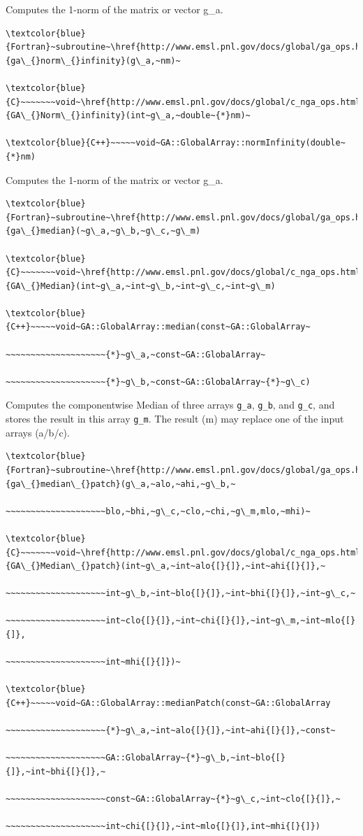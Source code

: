 Computes the 1-norm of the matrix or vector g\_a. 
\begin{verbatim}
\textcolor{blue}{Fortran}~subroutine~\href{http://www.emsl.pnl.gov/docs/global/ga_ops.html\#ga_norm_infinity}{ga\_{}norm\_{}infinity}(g\_a,~nm)~

\textcolor{blue}{C}~~~~~~~void~\href{http://www.emsl.pnl.gov/docs/global/c_nga_ops.html\#ga_norm_infinity}{GA\_{}Norm\_{}infinity}(int~g\_a,~double~{*}nm)~

\textcolor{blue}{C++}~~~~~void~GA::GlobalArray::normInfinity(double~{*}nm)
\end{verbatim}
Computes the 1-norm of the matrix or vector g\_a. 
\begin{verbatim}
\textcolor{blue}{Fortran}~subroutine~\href{http://www.emsl.pnl.gov/docs/global/ga_ops.html\#ga_median}{ga\_{}median}(~g\_a,~g\_b,~g\_c,~g\_m)

\textcolor{blue}{C}~~~~~~~void~\href{http://www.emsl.pnl.gov/docs/global/c_nga_ops.html\#ga_median}{GA\_{}Median}(int~g\_a,~int~g\_b,~int~g\_c,~int~g\_m)

\textcolor{blue}{C++}~~~~~void~GA::GlobalArray::median(const~GA::GlobalArray~

~~~~~~~~~~~~~~~~~~~~{*}~g\_a,~const~GA::GlobalArray~

~~~~~~~~~~~~~~~~~~~~{*}~g\_b,~const~GA::GlobalArray~{*}~g\_c)
\end{verbatim}
Computes the componentwise Median of three arrays \texttt{g\_a}, \texttt{g\_b},
and \texttt{g\_c}, and stores the result in this array \texttt{g\_m}.
The result (m) may replace one of the input arrays (a/b/c). 
\begin{verbatim}
\textcolor{blue}{Fortran}~subroutine~\href{http://www.emsl.pnl.gov/docs/global/ga_ops.html\#ga_median_patch}{ga\_{}median\_{}patch}(g\_a,~alo,~ahi,~g\_b,~

~~~~~~~~~~~~~~~~~~~~blo,~bhi,~g\_c,~clo,~chi,~g\_m,mlo,~mhi)~

\textcolor{blue}{C}~~~~~~~void~\href{http://www.emsl.pnl.gov/docs/global/c_nga_ops.html\#ga_median_patch}{GA\_{}Median\_{}patch}(int~g\_a,~int~alo{[}{]},~int~ahi{[}{]},~

~~~~~~~~~~~~~~~~~~~~int~g\_b,~int~blo{[}{]},~int~bhi{[}{]},~int~g\_c,~

~~~~~~~~~~~~~~~~~~~~int~clo{[}{]},~int~chi{[}{]},~int~g\_m,~int~mlo{[}{]},

~~~~~~~~~~~~~~~~~~~~int~mhi{[}{]})~

\textcolor{blue}{C++}~~~~~void~GA::GlobalArray::medianPatch(const~GA::GlobalArray

~~~~~~~~~~~~~~~~~~~~{*}~g\_a,~int~alo{[}{]},~int~ahi{[}{]},~const~

~~~~~~~~~~~~~~~~~~~~GA::GlobalArray~{*}~g\_b,~int~blo{[}{]},~int~bhi{[}{]},~

~~~~~~~~~~~~~~~~~~~~const~GA::GlobalArray~{*}~g\_c,~int~clo{[}{]},~

~~~~~~~~~~~~~~~~~~~~int~chi{[}{]},~int~mlo{[}{]},int~mhi{[}{]})
\end{verbatim}
